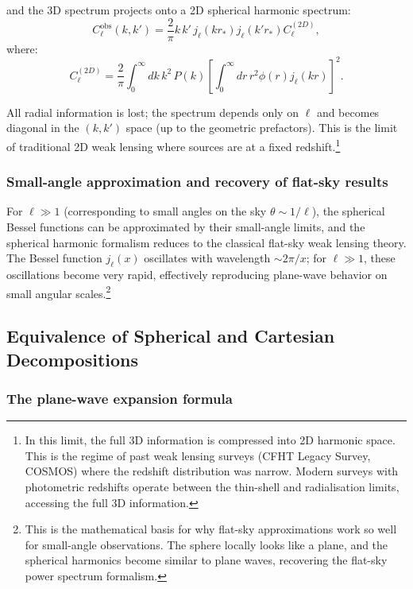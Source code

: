 and the 3D spectrum projects onto a 2D spherical harmonic spectrum:
\begin{equation}
C^{\text{obs}}_\ell(k, k') = \frac{2}{\pi} k \, k' \, j_\ell(kr_*) j_\ell(k'r_*) C_\ell^{(2D)},
\label{eq:3d_to_2d_projection}
\end{equation}
where:
\begin{equation}
C_\ell^{(2D)} = \frac{2}{\pi} \int_0^\infty dk \, k^2 \, P(k) \left[\int_0^\infty dr \, r^2 \phi(r) j_\ell(kr)\right]^2.
\label{eq:2d_spectrum_definition}
\end{equation}

All radial information is lost; the spectrum depends only on $\ell$ and becomes diagonal in the $(k, k')$ space (up to the geometric
prefactors). This is the limit of traditional 2D weak lensing where sources are at a fixed redshift.\footnote{In this limit, the
full 3D information is compressed into 2D harmonic space. This is the regime of past weak lensing surveys (CFHT Legacy Survey,
COSMOS) where the redshift distribution was narrow. Modern surveys with photometric redshifts operate between the thin-shell
and radialisation limits, accessing the full 3D information.}

\subsubsection{Small-angle approximation and recovery of flat-sky results}

For $\ell \gg 1$ (corresponding to small angles on the sky $\theta \sim 1/\ell$), the spherical Bessel functions can be approximated
by their small-angle limits, and the spherical harmonic formalism reduces to the classical flat-sky weak lensing theory. The Bessel
function $j_\ell(x)$ oscillates with wavelength $\sim 2\pi/x$; for $\ell \gg 1$, these oscillations become very rapid, effectively
reproducing plane-wave behavior on small angular scales.\footnote{This is the mathematical basis for why flat-sky approximations work
so well for small-angle observations. The sphere locally looks like a plane, and the spherical harmonics become similar to plane waves,
recovering the flat-sky power spectrum formalism.}

\subsection{Equivalence of Spherical and Cartesian Decompositions}

\subsubsection{The plane-wave expansion formula}

